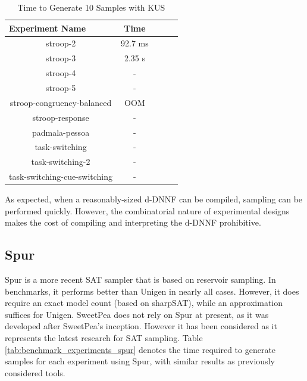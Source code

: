 \begin{table}[t]
  \centering
  \caption{Time to Generate 10 Samples with KUS}
\begin{tabular}{|c|c|c|c|c|}
\hline
\multicolumn{1}{|l|}{Experiment Name} & Time        \\ \hline
stroop-2                              & 92.7 ms     \\ \hline
stroop-3                              & 2.35 s      \\ \hline
stroop-4                              & -           \\ \hline
stroop-5                              & -           \\ \hline
stroop-congruency-balanced            & OOM         \\ \hline  %
stroop-response                       & -           \\ \hline
padmala-pessoa                        & -           \\ \hline
task-switching                        & -           \\ \hline
task-switching-2                      & -           \\ \hline
task-switching-cue-switching          & -           \\ \hline
\end{tabular}
\label{tab:benchmark_experiments_kus}%
\end{table}

As expected, when a reasonably-sized d-DNNF can be compiled, sampling can be performed quickly. However, the combinatorial nature of experimental designs makes the cost of compiling and interpreting the d-DNNF prohibitive.


\subsection{Spur}

Spur \cite{spur} is a more recent SAT sampler that is based on reservoir sampling. In benchmarks, it performs better than Unigen in nearly all cases. However, it does require an exact model count (based on sharpSAT), while an approximation suffices for Unigen. SweetPea does not rely on Spur at present, as it was developed after SweetPea's inception. However it has been considered as it represents the latest research for SAT sampling. Table \ref{tab:benchmark_experiments_spur} denotes the time required to generate samples for each experiment using Spur, with similar results as previously considered tools.

